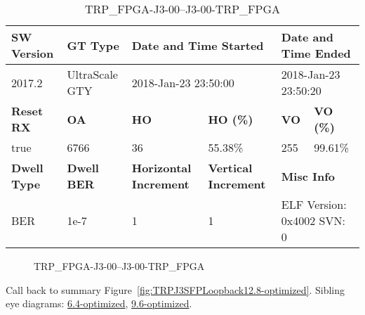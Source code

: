 \begin{table}[h]
\centering
\caption{TRP\_FPGA-J3-00--J3-00-TRP\_FPGA}
\label{tab:TRPFPGAJ300J300TRPFPGA12.8-optimized}
\begin{tabular}{@{}|l|l|l|l|l|l|@{}}
\toprule
\textbf{SW Version}                & \textbf{GT Type}   & \multicolumn{2}{l|}{\textbf{Date and Time Started}}            & \multicolumn{2}{l|}{\textbf{Date and Time Ended}}        \\ \midrule
2017.2                       & UltraScale GTY          & \multicolumn{2}{l|}{2018-Jan-23 23:50:00}                   & \multicolumn{2}{l|}{2018-Jan-23 23:50:20}               \\ \midrule
\textbf{Reset RX}                  & \textbf{OA} & \textbf{HO}   & \textbf{HO (\%)} & \textbf{VO} & \textbf{VO (\%)} \\ \midrule
true & 6766        & 36          & 55.38\%        & 255        & 99.61\%       \\ \midrule
\textbf{Dwell Type}                & \textbf{Dwell BER} & \textbf{Horizontal Increment} & \textbf{Vertical Increment}    & \multicolumn{2}{l|}{\textbf{Misc Info}}                  \\ \midrule
BER                            & 1e-7        & 1        & 1           & \multicolumn{2}{l|}{ELF Version: 0x4002 SVN: 0}                         \\ \bottomrule
\end{tabular}
\end{table}

\begin{figure}[h]
\caption{TRP\_FPGA-J3-00--J3-00-TRP\_FPGA} \label{fig:TRPFPGAJ300J300TRPFPGA12.8-optimized}
\end{figure}

Call back to summary Figure~\ref{fig:TRPJ3SFPLoopback12.8-optimized}.
Sibling eye diagrams: \hyperref[sec:TRPFPGAJ300J300TRPFPGA6.4-optimized]{6.4-optimized}, \hyperref[sec:TRPFPGAJ300J300TRPFPGA9.6-optimized]{9.6-optimized}.

\clearpage
\newpage

